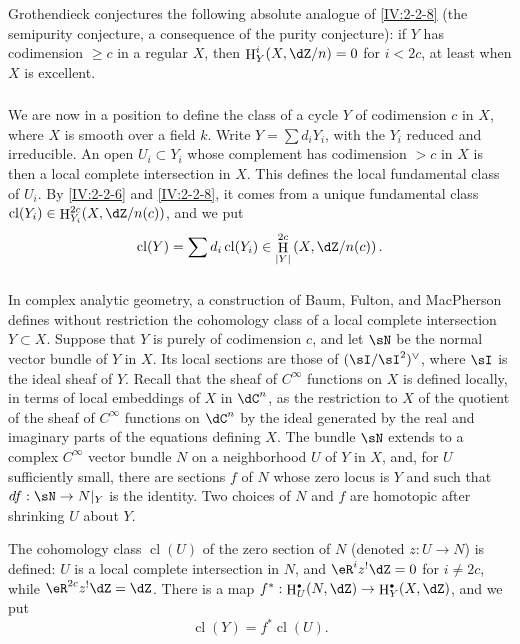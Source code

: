\documentclass[12pt,oneside,english]{smfbook}
\DeclareMathOperator{\cl}{cl}
\DeclareMathOperator{\h}{H}
\let\oldbullet\bullet
\renewcommand{\bullet}{\textnormal{\tiny$\oldbullet$}}
\begin{document}
Grothendieck conjectures the following absolute analogue of \ref{IV:2-2-8} (the semipurity conjecture, a consequence of the purity conjecture): if $Y$ has codimension $\geqslant c$ in a regular $X$, then $\h_Y^i(X,\dZ/n)=0$ for $i<2c$, at least when $X$ is excellent.

\subsubsection{}\label{IV:2-2-10}

We are now in a position to define the class of a cycle $Y$ of codimension $c$ in $X$, where $X$ is smooth over a field $k$. Write $Y=\sum d_iY_i$, with the $Y_i$ reduced and irreducible. An open $U_i\subset Y_i$ whose complement has codimension $>c$ in $X$ is then a local complete intersection in $X$. This defines the local fundamental class of $U_i$. By \ref{IV:2-2-6} and \ref{IV:2-2-8}, it comes from a unique fundamental class $\cl(Y_i)\in\h_{Y_i}^{2c}(X,\dZ/n(c))$, and we put
\[
  \cl(Y) = \sum d_i \cl(Y_i) \in \h_{|Y|}^{2 c}\left(X,\dZ/n(c)\right) \text{.}
\]

\subsubsection{}\label{IV:2-2-11}

In complex analytic geometry, a construction of Baum, Fulton, and MacPherson \cite{bfm75} defines without restriction the cohomology class of a local complete intersection $Y\subset X$. Suppose that $Y$ is purely of codimension $c$, and let $\sN$ be the normal vector bundle of $Y$ in $X$. Its local sections are those of $(\sI/\sI^2)^\vee$, where $\sI$ is the ideal sheaf of $Y$. Recall that the sheaf of $C^\infty$ functions on $X$ is defined locally, in terms of local embeddings of $X$ in $\dC^n$, as the restriction to $X$ of the quotient of the sheaf of $C^\infty$ functions on $\dC^n$ by the ideal generated by the real and imaginary parts of the equations defining $X$. The bundle $\sN$ extends to a complex $C^\infty$ vector bundle $N$ on a neighborhood $U$ of $Y$ in $X$, and, for $U$ sufficiently small, there are sections $f$ of $N$ whose zero locus is $Y$ and such that $df:\sN\to N|_Y$ is the identity. Two choices of $N$ and $f$ are homotopic after shrinking $U$ about $Y$.

The cohomology class $\cl(U)$ of the zero section of $N$ (denoted $z:U\to N$) is defined: $U$ is a local complete intersection in $N$, and $\eR^iz^!\dZ=0$ for $i\ne2c$, while $\eR^{2c}z^!\dZ=\dZ$. There is a map $f^*:\h_U^\bullet(N,\dZ)\to\h_Y^\bullet(X,\dZ)$, and we put
\[
  \cl(Y) = f^*\cl(U) \text{.}
\]
\end{document}
